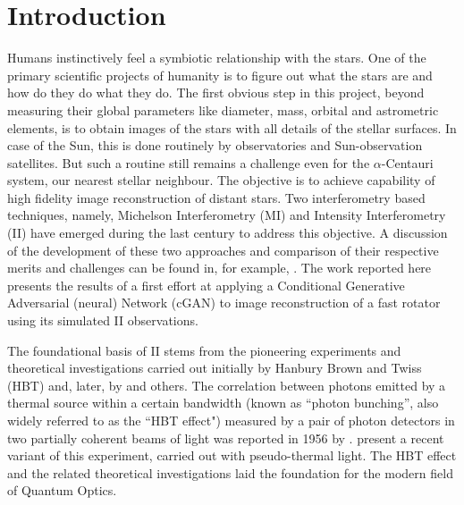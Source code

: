 \section{Introduction}\label{sec:intro}
Humans instinctively feel a symbiotic relationship with the stars. One of the primary scientific projects of humanity is to figure out what the stars are and how do they do what they do. The first obvious step in this project, beyond measuring their global parameters like diameter, mass, orbital and astrometric elements, is to obtain images of the stars with all details of the stellar surfaces. In case of the Sun, this is done routinely by observatories and Sun-observation satellites. But such a routine still remains a challenge even for the $\alpha$-Centauri system, our nearest stellar neighbour. The objective is to achieve capability of high fidelity image reconstruction of distant stars. Two interferometry based techniques, namely, Michelson Interferometry (MI) and Intensity Interferometry (II) have emerged during the last century to address this objective. A discussion of the development of these two approaches and comparison of their respective merits and challenges can be found in, for example, \cite{Rai2025}. The work reported here presents the results of a first effort at applying a Conditional Generative Adversarial (neural) Network (cGAN) to image reconstruction of a fast rotator using its simulated II observations.  

The foundational basis of II stems from the pioneering experiments and theoretical investigations carried out initially by Hanbury Brown and Twiss (HBT) \citep{HBT56Lab,brown1957interferometry, brown1958interferometry} and, later, by \cite{glauber1963quantum} and others. The correlation between photons emitted by a thermal source within a certain bandwidth (known as ``photon bunching'', also widely referred to as the ``HBT effect") measured by a pair of photon detectors in two partially coherent beams of light was reported in 1956 by \cite{HBT56Lab}. \cite{Rai2025} present a recent variant of this experiment, carried out with pseudo-thermal light. The HBT effect and the related theoretical investigations laid the foundation for the modern field of Quantum Optics.

